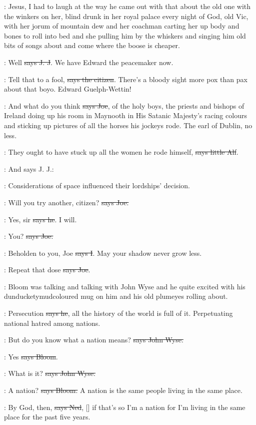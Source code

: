 \Nq:
Jesus, I had to laugh at the way he came out with that about the old one
with the winkers on her, blind drunk in her royal palace every night of
God, old Vic, with her jorum of mountain dew and her coachman carting her
up body and bones to roll into bed and she pulling him by the whiskers
and singing him old bits of songs about 
and come where the boose is cheaper.

\jjom:
Well \sout{says J. J}.
We have Edward the peacemaker now.

\citizen:
Tell that to a fool, \sout{says the citizen}.
There's a bloody sight more pox
than pax about that boyo. Edward Guelph-Wettin!

\joe:
And what do you think \sout{says Joe}, of the holy boys, the priests and
bishops of Ireland doing up his room in Maynooth in His Satanic Majesty's
racing colours and sticking up pictures of all the horses his jockeys
rode. The earl of Dublin, no less.

\bergan:
They ought to have stuck up all the women
he rode himself, \sout{says little
Alf}.

\Nq:
And says J. J.:

\jjom:
Considerations of space influenced
their lordships' decision.

\joe:
Will you try another, citizen? \sout{says Joe.}

\citizen:
Yes, sir \sout{says he}.
I will.

\joe:
You? \sout{says Joe.}

:
Beholden to you, Joe \sout{says I}.
May your shadow never grow less.

\joe:
Repeat that dose \sout{says Joe}.

\Nq:
Bloom was talking and talking with John Wyse and he quite excited with
his dunducketymudcoloured mug on him and his old plumeyes rolling about.

\Bloom:
Persecution \sout{says he},
all the history of the world is full of it.
Perpetuating national hatred among nations.

\johnwyse:
But do you know what a nation means?
\sout{says John Wyse.}

\Bloom:
Yes \sout{says Bloom}.

\johnwyse:
What is it? \sout{says John Wyse.}

\Bloom:
A nation? \sout{says Bloom.}
A nation is the same people living in the same place.

\lambert:
By God, then, \sout{says Ned},
[] if that's so I'm a nation for I'm
living in the same place for the past five years.

